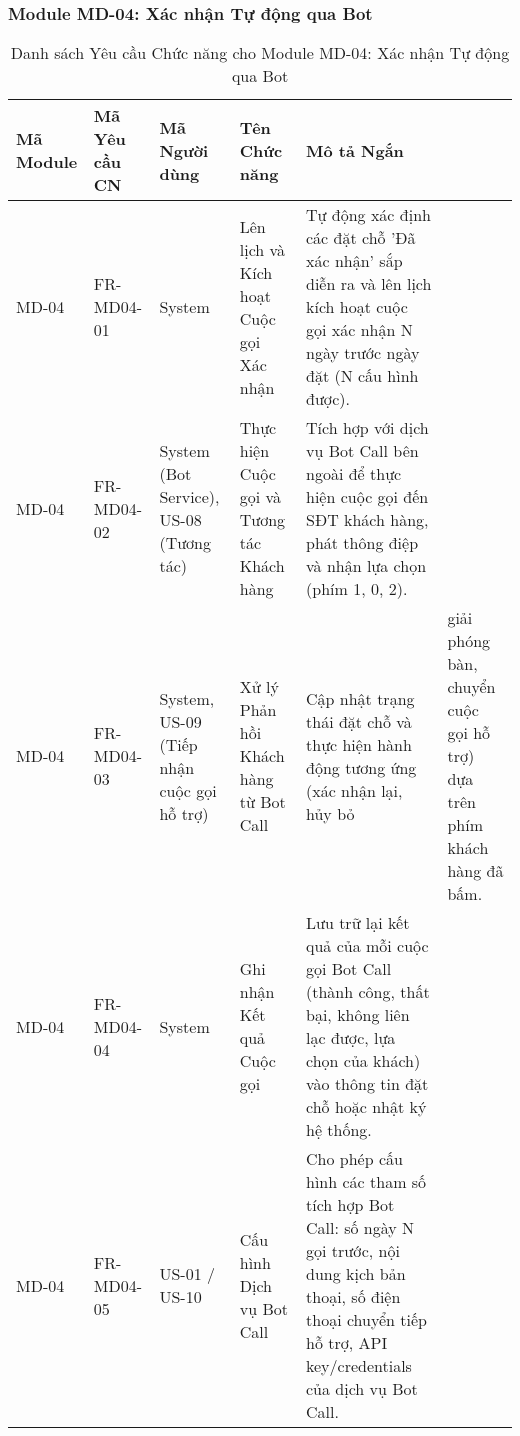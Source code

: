 \subsubsection{Module MD-04: Xác nhận Tự động qua Bot}

\begin{longtable}{|m{2cm}|m{2.5cm}|m{2.5cm}|m{4.5cm}|m{3.5cm}|}
\caption{Danh sách Yêu cầu Chức năng cho Module MD-04: Xác nhận Tự động qua Bot} \label{tab:fr_md04} \\
\hline
\textbf{Mã Module} & \textbf{Mã Yêu cầu CN} & \textbf{Mã Người dùng} & \textbf{Tên Chức năng} & \textbf{Mô tả Ngắn} \\
\hline
\endhead %

\hline
\endfoot %

\hline
\endlastfoot %

MD-04 & FR-MD04-01 & System & Lên lịch và Kích hoạt Cuộc gọi Xác nhận & Tự động xác định các đặt chỗ 'Đã xác nhận' sắp diễn ra và lên lịch kích hoạt cuộc gọi xác nhận N ngày trước ngày đặt (N cấu hình được). \\
\hline
MD-04 & FR-MD04-02 & System (Bot Service), US-08 (Tương tác) & Thực hiện Cuộc gọi và Tương tác Khách hàng & Tích hợp với dịch vụ Bot Call bên ngoài để thực hiện cuộc gọi đến SĐT khách hàng, phát thông điệp và nhận lựa chọn (phím 1, 0, 2). \\
\hline
MD-04 & FR-MD04-03 & System, US-09 (Tiếp nhận cuộc gọi hỗ trợ) & Xử lý Phản hồi Khách hàng từ Bot Call & Cập nhật trạng thái đặt chỗ và thực hiện hành động tương ứng (xác nhận lại, hủy bỏ & giải phóng bàn, chuyển cuộc gọi hỗ trợ) dựa trên phím khách hàng đã bấm. \\
\hline
MD-04 & FR-MD04-04 & System & Ghi nhận Kết quả Cuộc gọi & Lưu trữ lại kết quả của mỗi cuộc gọi Bot Call (thành công, thất bại, không liên lạc được, lựa chọn của khách) vào thông tin đặt chỗ hoặc nhật ký hệ thống. \\
\hline
MD-04 & FR-MD04-05 & US-01 / US-10 & Cấu hình Dịch vụ Bot Call & Cho phép cấu hình các tham số tích hợp Bot Call: số ngày N gọi trước, nội dung kịch bản thoại, số điện thoại chuyển tiếp hỗ trợ, API key/credentials của dịch vụ Bot Call. \\
\hline

\end{longtable}

